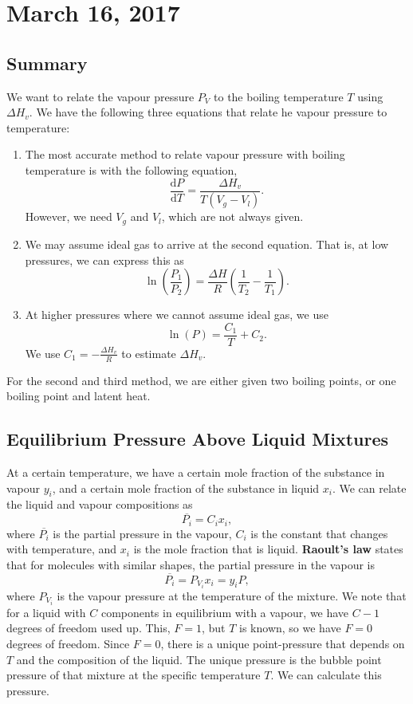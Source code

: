 \documentclass[11pt]{article}
\theoremstyle{plain} %
\theoremstyle{definition}
\theoremstyle{example}
\theoremstyle{remark}
\begin{document}
\section{March 16, 2017}
\subsection{Summary}
We want to relate the vapour pressure $P_V$ to the boiling temperature $T$ using $\Delta H_v$. We have the following three equations that relate he vapour pressure to temperature:
\begin{enumerate}
	\item The most accurate method to relate vapour pressure with boiling temperature is with the following equation,$$\frac{\mathrm d P}{\mathrm d T} = \frac{\Delta H_v}{T(V_g-V_l)}.$$ However, we need $V_g$ and $V_l$, which are not always given. 
	\item We may assume ideal gas to arrive at the second equation. That is, at low pressures, we can express this as 
	$$\ln\left(\frac{P_1}{P_2}\right) = \frac{\Delta H}{R}\left(\frac{1}{T_2} - \frac{1}{T_1}\right).$$
	\item At higher pressures where we cannot assume ideal gas, we use $$\ln(P) = \frac{C_1}{T} + C_2.$$ We use $C_1 = -\frac{\Delta H_v}{R}$ to estimate $\Delta H_v$. 
\end{enumerate}
For the second and third method, we are either given two boiling points, or one boiling point and latent heat. 

\subsection{Equilibrium Pressure Above Liquid Mixtures}

At a certain temperature, we have a certain mole fraction of the substance in vapour $y_i$, and a certain mole fraction of the substance in liquid $x_i$. We can relate the liquid and vapour compositions as 
$$\overline{P_i} = C_ix_i,$$
where $\overline{P_i}$ is the partial pressure in the vapour, $C_i$ is the constant that changes with temperature, and $x_i$ is the mole fraction that is liquid. \textbf{Raoult's law} states that for molecules with similar shapes, the partial pressure in the vapour is 
$$\overline{P_i} = P_{V_i}x_i = y_iP,$$
where $P_{V_i}$ is the vapour pressure at the temperature of the mixture. We note that for a liquid with $C$ components in equilibrium with a vapour, we have $C-1$ degrees of freedom used up. This, $F=1$, but $T$ is known, so we have $F=0$ degrees of freedom. Since $F=0$, there is a unique point-pressure that depends on $T$ and the composition of the liquid. The unique pressure is the bubble point pressure of that mixture at the specific temperature $T$. We can calculate this pressure. 
\end{document}
